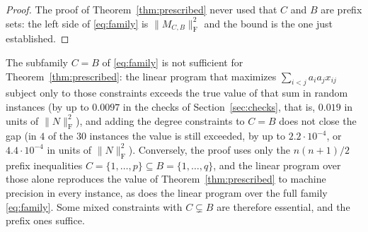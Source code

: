 \documentclass[11pt]{article}
\newcommand{\F}{\mathrm F}
\begin{document}
\begin{proof}
The proof of Theorem~\ref{thm:prescribed} never used that $C$ and $B$ are
prefix sets: the left side of \eqref{eq:family} is $\|M_{C,B}\|_\F^2$ and the
bound is the one just established.
\end{proof}

\begin{remark}\label{rem:lp}
The subfamily $C=B$ of \eqref{eq:family} is not sufficient for
Theorem~\ref{thm:prescribed}: the linear program that maximizes
$\sum_{i<j}a_ia_jx_{ij}$ subject only to those constraints exceeds the true
value of that sum in random instances (by up to $0.0097$ in the checks of
Section~\ref{sec:checks}, that is, $0.019$ in units of $\|N\|_\F^2$), and
adding the degree constraints to $C=B$ does not close the gap (in $4$ of the
$30$ instances the value is still exceeded, by up to $2.2\cdot10^{-4}$, or
$4.4\cdot10^{-4}$ in units of $\|N\|_\F^2$). Conversely, the proof uses only the
$n(n+1)/2$ prefix inequalities $C=\{1,\dots,p\}\subseteq B=\{1,\dots,q\}$, and
the linear program over those alone reproduces the value of
Theorem~\ref{thm:prescribed} to machine precision in every instance, as does
the linear program over the full family \eqref{eq:family}. Some mixed
constraints with $C\subsetneq B$ are therefore essential, and the prefix ones
suffice.
\end{remark}
\end{document}
